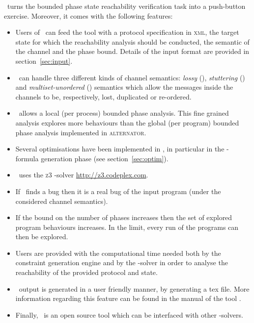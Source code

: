 \MPass\ turns the bounded phase state reachability verification task into a push-button exercise.
Moreover, it comes with the following features:

\begin{itemize}
\item Users of \MPass\ can feed the tool with a protocol specification in \textsc{xml}, the target state for which the reachability analysis should be conducted, the semantic of the channel and the phase bound. Details of the input format are provided in section~\ref{sec:input}.
%
\item \MPass\ can handle three different kinds of channel semantics: {\it lossy} (\Lcs), {\it stuttering} (\Slcs) and {\it multiset-unordered} (\Ucs) semantics which allow the messages inside the channels to be, respectively, lost, duplicated or re-ordered.
\item \MPass\ allows a local (per process) bounded phase analysis.
This fine grained analysis explores more behaviours than the global (per program) bounded phase analysis implemented in \textsc{alternator}.
%
\item Several optimisations have been implemented in \MPass, in particular in the \Smt-formula generation phase (see section~\ref{sec:optim}).
%
\item \MPass\ uses the \textsc{z3} \Smt-solver \url{http://z3.codeplex.com}.
\item If \MPass\ finds a bug then it is a real bug of the input program (under the considered channel semantics).
%
\item If the bound on the number of phases increases then the set of explored program behaviours increases.
In the limit, every run of the programs can then be explored.
\item Users are provided with the computational time needed both by the constraint generation engine and by
  the \Smt-solver in order to analyse the reachability of the provided protocol and state.
%
\item \MPass\ output is generated in a user friendly manner, by generating a tex file.
More information regarding this feature can be found in the manual of the tool \cite{github.MPass}.
%
\item Finally, \MPass\ is an open source tool which can be interfaced with other \Smt-solvers.
\end{itemize}


